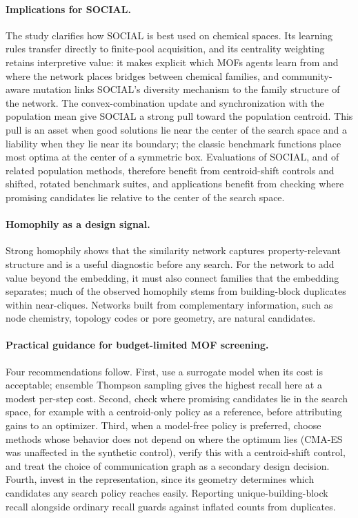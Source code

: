 \documentclass[journal=jcisd8,manuscript=article]{achemso}
\begin{document}
\paragraph{Implications for SOCIAL.}
The study clarifies how SOCIAL is best used on chemical spaces. Its learning rules transfer directly to finite-pool acquisition, and its centrality weighting retains interpretive value: it makes explicit which MOFs agents learn from and where the network places bridges between chemical families, and community-aware mutation links SOCIAL's diversity mechanism to the family structure of the network. The convex-combination update and synchronization with the population mean give SOCIAL a strong pull toward the population centroid. This pull is an asset when good solutions lie near the center of the search space and a liability when they lie near its boundary; the classic benchmark functions place most optima at the center of a symmetric box. Evaluations of SOCIAL, and of related population methods, therefore benefit from centroid-shift controls and shifted, rotated benchmark suites, and applications benefit from checking where promising candidates lie relative to the center of the search space.

\paragraph{Homophily as a design signal.}
Strong homophily shows that the similarity network captures property-relevant structure and is a useful diagnostic before any search. For the network to add value beyond the embedding, it must also connect families that the embedding separates; much of the observed homophily stems from building-block duplicates within near-cliques. Networks built from complementary information, such as node chemistry, topology codes or pore geometry, are natural candidates.

\paragraph{Practical guidance for budget-limited MOF screening.}
Four recommendations follow. First, use a surrogate model when its cost is acceptable; ensemble Thompson sampling gives the highest recall here at a modest per-step cost. Second, check where promising candidates lie in the search space, for example with a centroid-only policy as a reference, before attributing gains to an optimizer. Third, when a model-free policy is preferred, choose methods whose behavior does not depend on where the optimum lies (CMA-ES was unaffected in the synthetic control), verify this with a centroid-shift control, and treat the choice of communication graph as a secondary design decision. Fourth, invest in the representation, since its geometry determines which candidates any search policy reaches easily. Reporting unique-building-block recall alongside ordinary recall guards against inflated counts from duplicates.
\end{document}
